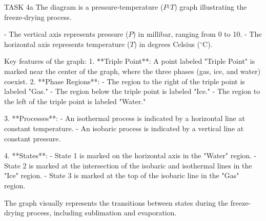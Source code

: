 TASK 4a  
The diagram is a pressure-temperature (\(P\)-\(T\)) graph illustrating the freeze-drying process.  

- The vertical axis represents pressure (\(P\)) in millibar, ranging from 0 to 10.  
- The horizontal axis represents temperature (\(T\)) in degrees Celsius (\(^\circ\text{C}\)).  

Key features of the graph:  
1. **Triple Point**: A point labeled "Triple Point" is marked near the center of the graph, where the three phases (gas, ice, and water) coexist.  
2. **Phase Regions**:  
   - The region to the right of the triple point is labeled "Gas."  
   - The region below the triple point is labeled "Ice."  
   - The region to the left of the triple point is labeled "Water."  

3. **Processes**:  
   - An isothermal process is indicated by a horizontal line at constant temperature.  
   - An isobaric process is indicated by a vertical line at constant pressure.  

4. **States**:  
   - State 1 is marked on the horizontal axis in the "Water" region.  
   - State 2 is marked at the intersection of the isobaric and isothermal lines in the "Ice" region.  
   - State 3 is marked at the top of the isobaric line in the "Gas" region.  

The graph visually represents the transitions between states during the freeze-drying process, including sublimation and evaporation.